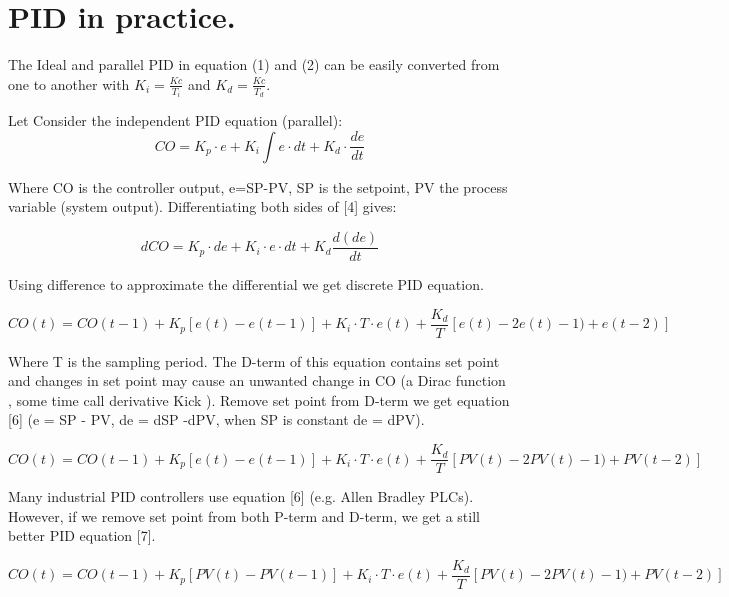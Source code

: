 \section{PID in practice.}
The Ideal and parallel PID in equation (1) and (2) can be easily converted from one to another with  $K_i = \frac{Kc}{T_i}$ and $K_d = \frac{Kc}{T_d}$.

Let Consider the independent PID equation (parallel):
\begin{equation}
\label{eqn:4}
     CO = K_p\cdot e + K_i\int e\cdot dt +K_d\cdot\frac{de}{dt}
\end{equation}

Where CO is the controller output, e=SP-PV, SP is the setpoint, PV the process variable (system output). Differentiating both sides of [4] gives:

\begin{equation}
\label{eqn:5}
    dCO = K_p\cdot de + K_i\cdot e \cdot dt + K_d\frac{d(de)}{dt}
\end{equation}

Using difference to approximate the differential we get discrete PID equation.

\begin{equation}
\label{eqn:6}
    CO(t) = CO(t-1) + K_p[e(t) - e(t-1)] + K_i\cdot T \cdot e(t) + \frac{K_d}{T}[e(t) - 2e(t)-1) + e(t-2)]
\end{equation}

Where T is the sampling period. The D-term of this equation contains set point and changes in set point may cause an unwanted change in CO (a Dirac function \cite{Delta_Function}, some time call derivative Kick ). Remove set point from D-term we get equation [6] (e = SP - PV, de = dSP -dPV, when SP is constant de = dPV).

\begin{equation}
\label{eqn:7}
    CO(t) = CO(t-1) + K_p[e(t) - e(t-1)] + K_i\cdot T \cdot e(t) + \frac{K_d}{T}[PV(t) - 2PV(t)-1) + PV(t-2)]
\end{equation}

Many industrial PID controllers use equation [6] (e.g. Allen Bradley PLCs). However, if we remove set point from both P-term and D-term, we get a still better PID equation [7].

\begin{equation}
\label{eqn:8}
    CO(t) = CO(t-1) + K_p[PV(t) - PV(t-1)] + K_i\cdot T \cdot e(t) + \frac{K_d}{T}[PV(t) - 2PV(t)-1) + PV(t-2)]
\end{equation}

